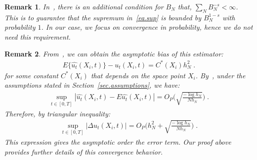 \documentclass[a4paper,11pt]{article}
\newtheorem{remark}{Remark}[section]
\begin{document}
\begin{remark}
In~\cite{mack1982weak}, there is an additional condition for $B_N$ that, $\sum_{N}B_N^{-s}<\infty$. This is to guarantee that the supremum in~\eqref{eq.sup} is bounded by $B_N^{1-s}$ with probability $1$. In our case, we focus on convergence in probability, hence we do not need this requirement.
\end{remark}
\begin{remark}
From~\cite{fan1997local}, we can obtain the asymptotic bias of this estimator:
\begin{align}
	E\{\widehat{u_t}(X_i,t)\}- u_t(X_i,t)=C^*(X_i)h_N^{2}\;.
\end{align}
for some constant $C^*(X_i)$ that depends on the space point $X_i$. By~\cite{mack1982weak,tusnady1977remark}, under the assumptions stated in Section~\ref{sec.assumptions}, we have:
\begin{align}
\sup_{t\in[0,T]}|\widehat{u_t}(X_i,t)-E\widehat{u_t}(X_i,t)|	=O_P\Big(\sqrt{\frac{-\log h_N}{Nh_N}}\Big)\;.
\end{align}
Therefore, by triangular inequality:
\begin{align}
\sup_{t\in[0,T]}|\Delta u_t(X_i,t)|=	O_P\Big(h_N^2+\sqrt{\frac{-\log h_N}{Nh_N}}\Big)\;.
\end{align}
This expression gives the asymptotic order the error term. Our proof above provides further details of this convergence behavior.
\end{remark}
\end{document}

